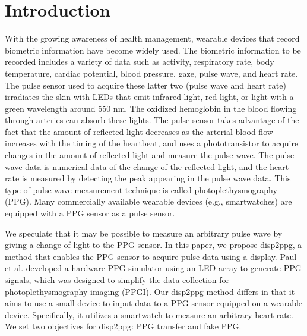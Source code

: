 \documentclass[sigchi,authordraft]{acmart}
\begin{document}
\section{Introduction}
\label{sec:introduction}
With the growing awareness of health management, wearable devices that record biometric information have become widely used. The biometric information to be recorded includes a variety of data such as activity, respiratory rate, body temperature, cardiac potential, blood pressure, gaze, pulse wave, and heart rate. The pulse sensor used to acquire these latter two (pulse wave and heart rate) irradiates the skin with LEDs that emit infrared light, red light, or light with a green wavelength around 550 nm. The oxidized hemoglobin in the blood flowing through arteries can absorb these lights. The pulse sensor takes advantage of the fact that the amount of reflected light decreases as the arterial blood flow increases with the timing of the heartbeat, and uses a phototransistor to acquire changes in the amount of reflected light and measure the pulse wave. The pulse wave data is numerical data of the change of the reflected light, and the heart rate is measured by detecting the peak appearing in the pulse wave data. This type of pulse wave measurement technique is called photoplethysmography (PPG). Many commercially available wearable devices (e.g., smartwatches) are equipped with a PPG sensor as a pulse sensor.\par

We speculate that it may be possible to measure an arbitrary pulse wave by giving a change of light to the PPG sensor. In this paper, we propose disp2ppg, a method that enables the PPG sensor to acquire pulse data using a display. Paul et al. \cite{ppg_generator} developed a hardware PPG simulator using an LED array to generate PPG signals, which was designed to simplify the data collection for photoplethysmography imaging (PPGI). Our disp2ppg method differs in that it aims to use a small device to input data to a PPG sensor equipped on a wearable device. Specifically, it utilizes a smartwatch to measure an arbitrary heart rate. We set two objectives for disp2ppg: PPG transfer and fake PPG.\par
\end{document}
